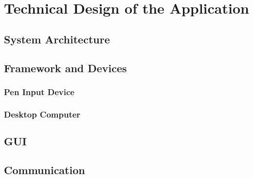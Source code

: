 
\chapter{Technical Design of the Application}
\section{System Architecture}
\section{Framework and Devices}
\subsection{Pen Input Device}
\subsection{Desktop Computer}

\section{GUI}
\section{Communication}
